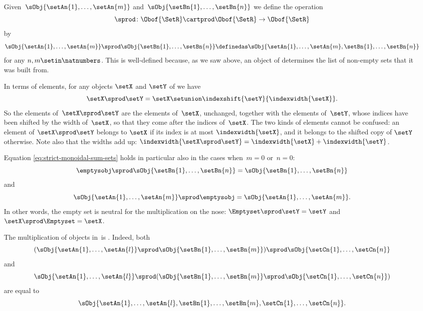 Given~$\sObj{\setAn{1}, \ldots, \setAn{m}}$ and~$\sObj{\setBn{1}, \ldots, \setBn{n}}$ we define the operation
\begin{equation}
    \label{eq:mult-setr-sign}
    \sprod \colon \Obof{\SetR} \cartprod \Obof{\SetR} \to \Obof{\SetR}
\end{equation}
by
\begin{equation}
    \label{eq:strict-monoidal-sum-sets}
    \sObj{\setAn{1}, \ldots, \setAn{m}} \sprod \sObj{\setBn{1}, \ldots, \setBn{n}}
    \definedas \sObj{\setAn{1}, \ldots, \setAn{m}, \setBn{1}, \ldots, \setBn{n}}
\end{equation}
for any $n, m \setin \natnumbers$.
This is well-defined because, as we saw above, an object of \SetR determines the list of non-empty sets that it was built from.

In terms of elements, for any objects $\setX$ and $\setY$ of \SetR we have
\begin{equation}
    \label{eq:strict-monoidal-sum-sets-elements}
    \setX \sprod \setY = \setX \setunion \indexshift{\setY}{\indexwidth{\setX}}.
\end{equation}
So the elements of~$\setX \sprod \setY$ are the elements of~$\setX$, unchanged, together with the elements of~$\setY$, whose indices have been shifted by the width of~$\setX$, so that they come after the indices of~$\setX$.
The two kinds of elements cannot be confused: an element of $\setX \sprod \setY$ belongs to $\setX$ if its index is at most $\indexwidth{\setX}$, and it belongs to the shifted copy of $\setY$ otherwise.
Note also that the widths add up: $\indexwidth{\setX \sprod \setY} = \indexwidth{\setX} + \indexwidth{\setY}$.

Equation \cref{eq:strict-monoidal-sum-sets} holds in particular also in the cases when~$m = 0$ or~$n =0$:
\begin{equation}
    \emptysobj \sprod \sObj{\setBn{1}, \ldots, \setBn{n}}
    =
    \sObj{\setBn{1}, \ldots, \setBn{n}}
\end{equation}
and
\begin{equation}
    \sObj{\setAn{1}, \ldots, \setAn{m}} \sprod \emptysobj
    =
    \sObj{\setAn{1}, \ldots, \setAn{m}}.
\end{equation}
In other words, the empty set is neutral for the multiplication on the nose: $\Emptyset \sprod \setY = \setY$ and $\setX \sprod \Emptyset = \setX$.

The multiplication of objects in~\SetR is .
Indeed, both
\begin{equation}
    ( \sObj{\setAn{1}, \ldots, \setAn{l}} \sprod \sObj{\setBn{1}, \ldots, \setBn{m}} ) \sprod \sObj{\setCn{1}, \ldots, \setCn{n}}
\end{equation}
and
\begin{equation}
    \sObj{\setAn{1}, \ldots, \setAn{l}} \sprod ( \sObj{\setBn{1}, \ldots, \setBn{m}} \sprod \sObj{\setCn{1}, \ldots, \setCn{n}} )
\end{equation}
are equal to
\begin{equation}
    \sObj{\setAn{1}, \ldots, \setAn{l}, \setBn{1}, \ldots, \setBn{m}, \setCn{1}, \ldots, \setCn{n}}.
\end{equation}

